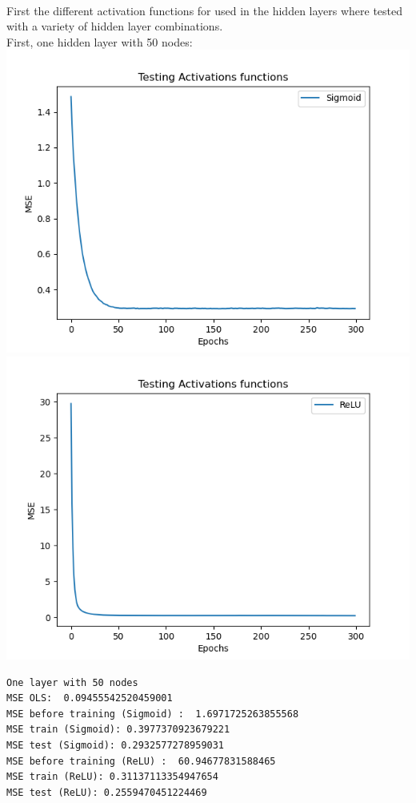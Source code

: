 \documentclass[12pt, letterpaper, twoside]{article}
\begin{document}
\ \\
First the different activation functions for used in the hidden layers where tested with a variety of hidden layer combinations.\\
First, one hidden layer with 50 nodes:\\
\includegraphics[scale=0.5]{"one_hidden_50_sigmoid"}\\
\includegraphics[scale=0.5]{"one_hidden_50_ReLU"}
\begin{verbatim}
One layer with 50 nodes
MSE OLS:  0.09455542520459001
MSE before training (Sigmoid) :  1.6971725263855568
MSE train (Sigmoid): 0.3977370923679221
MSE test (Sigmoid): 0.2932577278959031
MSE before training (ReLU) :  60.94677831588465
MSE train (ReLU): 0.31137113354947654
MSE test (ReLU): 0.2559470451224469
\end{verbatim}
\end{document}
